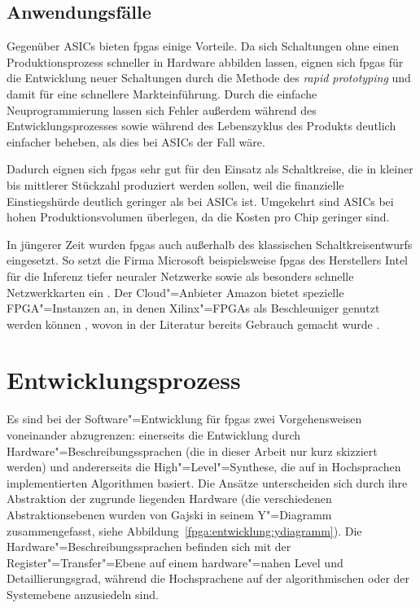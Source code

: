 \subsection{Anwendungsfälle}\label{fpga:ueberblick:anwendungen}

Gegenüber ASICs bieten \gls{fpga}s einige Vorteile. Da sich Schaltungen ohne
einen Produktionsprozess schneller in Hardware abbilden lassen, eignen sich
\gls{fpga}s für die Entwicklung neuer Schaltungen durch die Methode des
\textit{rapid prototyping} und damit für eine schnellere Markteinführung. Durch
die einfache Neuprogrammierung lassen sich Fehler außerdem während des
Entwicklungsprozesses sowie während des Lebenszyklus des Produkts deutlich
einfacher beheben, als dies bei ASICs der Fall wäre.
\cite[vgl.][10-1]{hawkins2010}

Dadurch eignen sich \gls{fpga}s sehr gut für den Einsatz als Schaltkreise, die
in kleiner bis mittlerer Stückzahl produziert werden sollen, weil die
finanzielle Einstiegshürde deutlich geringer als bei ASICs ist. Umgekehrt sind
ASICs bei hohen Produktionsvolumen überlegen, da die Kosten pro Chip geringer
sind.
\cite[vgl.][10-2]{hawkins2010}

In jüngerer Zeit wurden \gls{fpga}s auch außerhalb des klassischen
Schaltkreisentwurfs eingesetzt. So setzt die Firma Microsoft beispielsweise
\gls{fpga}s des Herstellers Intel für die Inferenz tiefer neuraler Netzwerke
\cite[vgl.][]{fowers2018, chung2018} sowie als besonders schnelle
Netzwerkkarten ein \cite[vgl.][]{firestone2018}. Der Cloud"=Anbieter Amazon
bietet spezielle FPGA"=Instanzen an, in denen Xilinx"=FPGAs als Beschleuniger
genutzt werden können \cite[vgl.][]{amazonec2f1}, wovon in der Literatur bereits
Gebrauch gemacht wurde \cite[vgl.][]{ditucci2017}.

\section{Entwicklungsprozess}\label{fpga:entwicklung}

Es sind bei der Software"=Entwicklung für \gls{fpga}s zwei Vorgehensweisen
voneinander abzugrenzen: einerseits die Entwicklung durch
Hardware"=Beschreibungssprachen (die in dieser Arbeit nur kurz skizziert
werden) und andererseits die High"=Level"=Synthese, die auf in Hochsprachen
implementierten Algorithmen basiert. Die Ansätze unterscheiden sich durch ihre
Abstraktion der zugrunde liegenden Hardware (die verschiedenen
Abstraktionsebenen wurden von Gajski in seinem Y"=Diagramm zusammengefasst, siehe
Abbildung~\ref{fpga:entwicklung:ydiagramm}). Die Hardware"=Beschreibungssprachen
befinden sich mit der Register"=Transfer"=Ebene auf einem hardware"=nahen Level
und Detaillierungsgrad, während die Hochsprachene auf der algorithmischen
oder der Systemebene anzusiedeln sind. \cite[vgl.][10--11]{kesel2013}

